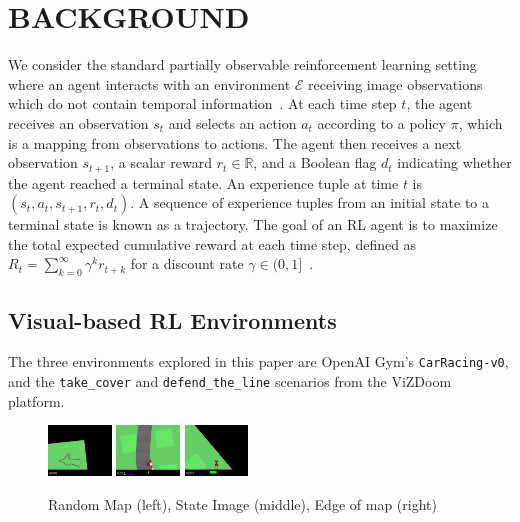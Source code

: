 \section{BACKGROUND}\label{background}

We consider the standard partially observable reinforcement learning setting where an agent interacts with an environment $\mathcal{E}$ receiving image observations which do not contain temporal information~\cite{arulkumaran2017brief}. At each time step $t$, the agent receives an observation $s_t$ and selects an action $a_t$ according to a policy $\pi$, which is a mapping from observations to actions. The agent then receives a next observation $s_{t+1}$, a scalar reward $r_t \in \mathbb{R}$, and a Boolean flag $d_t$ indicating whether the agent reached a terminal state. An experience tuple at time $t$ is $(s_t, a_t, s_{t+1}, r_t, d_t)$. A sequence of experience tuples from an initial state to a terminal state is known as a trajectory. The goal of an RL agent is to maximize the total expected cumulative reward at each time step, defined as $R_t = \sum_{k=0}^{\infty} \gamma^{k}r_{t+k}$ for a discount rate $\gamma \in (0,1]$~\cite{mnih2016asynchronous}.

\subsection{Visual-based RL Environments}

The three environments explored in this paper are OpenAI Gym's \texttt{CarRacing-v0}, and the \texttt{take\_cover} and \texttt{defend\_the\_line} scenarios from the ViZDoom platform.

\begin{figure}[h!]
	\centering
	\includegraphics[width=0.15\textwidth]{images/car-map.png}
	\includegraphics[width=0.15\textwidth]{images/car-tile.png}
	\includegraphics[width=0.15\textwidth]{images/car-die.png}
	\caption{Random Map (left), State Image (middle), Edge of map (right)}\label{fig:carracing}
\end{figure}

